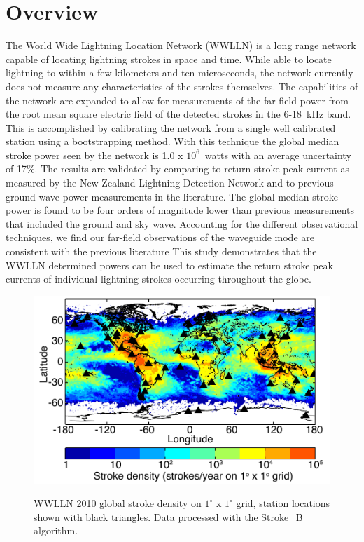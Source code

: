 \section{Overview}

The World Wide Lightning Location Network (WWLLN) is a long range network capable of locating lightning strokes in space and time.
While able to locate lightning to within a few kilometers and ten microseconds, the network currently does not measure any characteristics of the strokes themselves.
The capabilities of the network are expanded to allow for measurements of the far-field power from the root mean square electric field of the detected strokes in the 6-18~kHz band.
This is accomplished by calibrating the network from a single well calibrated station using a bootstrapping method.
With this technique the global median stroke power seen by the network is 1.0 x $10^6$~watts with an average uncertainty of 17\%.
The results are validated by comparing to return stroke peak current as measured by the New Zealand Lightning Detection Network and to previous ground wave power measurements in the literature.
The global median stroke power is found to be four orders of magnitude lower than previous measurements that included the ground and sky wave.
Accounting for the different observational techniques, we find our far-field observations of the waveguide mode are consistent with the previous literature
This study demonstrates that the WWLLN determined powers can be used to estimate the return stroke peak currents of individual lightning strokes occurring throughout the globe.

\begin{figure}[ht!]
\centering
\includegraphics[scale=2]{energy/Figures/PPS_WWLLN_2010.pdf}\\
\caption{WWLLN 2010 global stroke density on $1^\circ$ x $1^\circ$ grid, station locations shown with black triangles. Data processed with the Stroke\_B algorithm.}
\label{energy:fig:wwlln_dist}
\end{figure}

